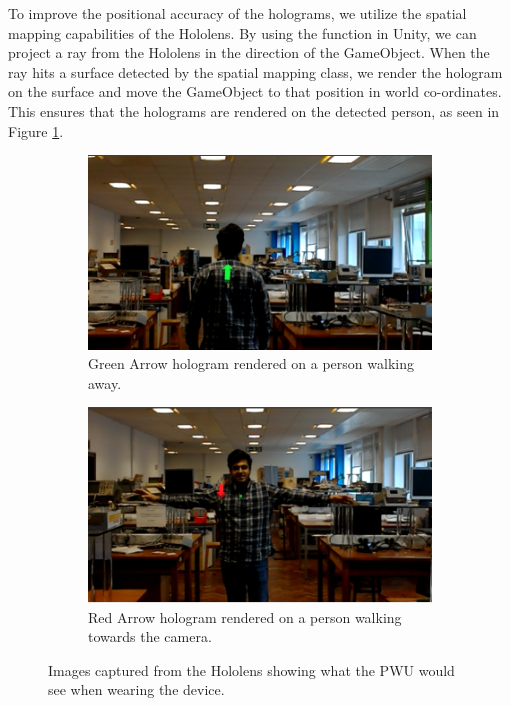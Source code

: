 To improve the positional accuracy of the holograms, we utilize the spatial mapping capabilities of the Hololens. By using the  function in Unity, we can project a ray from the Hololens in the direction of the GameObject. When the ray hits a surface detected by the spatial mapping class, we render the hologram on the surface and move the GameObject to that position in world co-ordinates. This ensures that the holograms are rendered on the detected person, as seen in Figure \ref{fig:greenredrender}.

\begin{figure}[ht]
	\begin{subfigure}[b]{.45\textwidth}
		\centering
		\includegraphics[width=1.0\linewidth]{img/chapter5_implementation/shreyAway.png}
		\caption{Green Arrow hologram rendered on a person walking away.}
	\end{subfigure}%
	\hspace{\fill} 
	\begin{subfigure}[b]{.45\textwidth}
		\centering
		\includegraphics[width=1.0\linewidth]{img/chapter5_implementation/shreyCome.png}
		\caption{Red Arrow hologram rendered on a person walking towards the camera.}
	\end{subfigure}
	\vspace{-1\baselineskip}
	\begin{center}
		\caption{Images captured from the Hololens showing what the PWU would see when wearing the device.}
		\label{fig:greenredrender}
	\end{center}
	\vspace{-2\baselineskip}
\end{figure}


